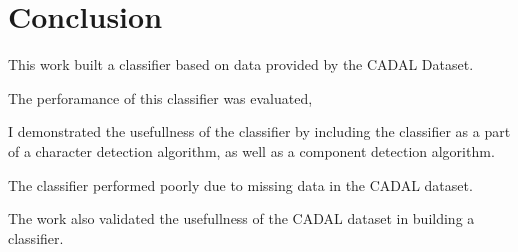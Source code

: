 \chapter{Conclusion}

This work built a classifier based on data provided by the CADAL Dataset.

The perforamance of this classifier was evaluated,

I demonstrated the usefullness of the classifier by including the classifier as a part of a character detection algorithm, as well as a component detection algorithm.

The classifier performed poorly due to missing data in the CADAL dataset. 



The work also validated the usefullness of the CADAL dataset in building a classifier.


